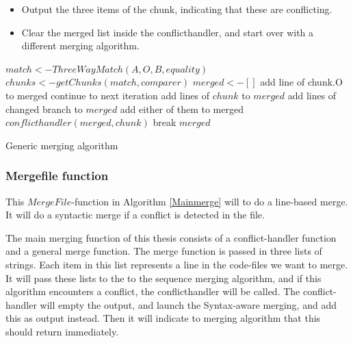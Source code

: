 \documentclass[11pt]{article}
\begin{document}
\begin{itemize}
   \item Output the three items of the chunk, indicating that these are conflicting.
   \item Clear the merged list inside the conflicthandler, and start over with a different merging algorithm.
\end{itemize}


\begin{algorithm}
\begin{algorithmic}
   \State $match  <- ThreeWayMatch(A, O, B, equality)$
   \State $chunks <- getChunks(match, comparer)$
   \State $merged <- []$
            \State add line of chunk.O to merged
            \State continue to next iteration
        \EndIf
            \State add lines of $chunk$ to $merged$
        \ElsIf
               \State add lines of changed branch to $merged$
            \ElsIf
                   \State add either of them to merged
                \ElsIf
                   \State $conflicthandler(merged, chunk)$
                      \State break
                   \EndIf
                \EndIf
			\EndIf
   		\EndIf
    \EndFor
	\State \Return $merged$
\EndFunction


\end{algorithmic}
\caption{Generic merging algorithm}
  \label{Genericmergingalgorithm}
\end{algorithm}

\subsubsection{Mergefile function}
This $MergeFile$-function in Algorithm \ref{Mainmerge} will to do a line-based merge. It will do a syntactic merge if a conflict is detected in the file.

The main merging function of this thesis consists of a conflict-handler function and a general merge function. The merge function is passed in three lists of strings. Each item in this list represents a line in the code-files we want to merge. It will pass these lists to the to the sequence merging algorithm, and if this algorithm encounters a conflict, the conflicthandler will be called. The conflict-handler will empty the output, and launch the Syntax-aware merging, and add this as output instead. Then it will indicate to merging algorithm that this should return immediately.
\end{document}
